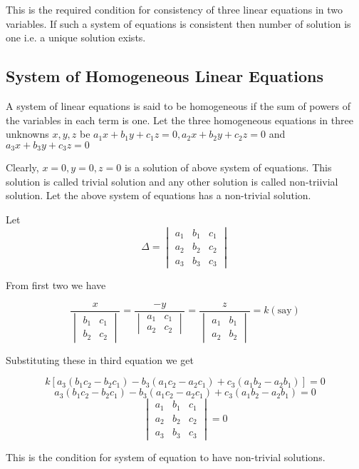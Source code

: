 This is the required condition for consistency of three linear equations in two variables. If such a system of equations is
consistent then number of solution is one i.e. a unique solution exists.

\subsection{System of Homogeneous Linear Equations}
A system of linear equations is said to be homogeneous if the sum of powers of the variables in each term is one. Let the three
homogeneous equations in three unknowns $x, y, z$ be $a_1x + b_1y + c_1z = 0, a_2x + b_2y + c_2z = 0$ and $a_3x + b_3y + c_3z = 0$

Clearly, $x = 0, y = 0, z= 0$ is a solution of above system of equations. This solution is called trivial solution and any other
solution is called non-triivial solution. Let the above system of equations has a non-trivial solution.

Let $$\Delta = \begin{vmatrix}a_1&b_1&c_1\\a_2&b_2&c_2\\a_3&b_3&c_3\end{vmatrix}$$

From first two we have

$$\frac{x}{\begin{vmatrix}b_1 & c_1\\b_2 & c_2\end{vmatrix}} =
\frac{-y}{\begin{vmatrix}a_1 & c_1\\a_2 & c_2\end{vmatrix}} =
\frac{z}{\begin{vmatrix}a_1 & b_1\\a_2 & b_2\end{vmatrix}} = k(\text{say})$$

Substituting these in third equation we get

$$k[a_3(b_1c_2 - b_2c_1) - b_3(a_1c_2 - a_2c_1) + c_3(a_1b_2 - a_2b_1)] =0$$
$$a_3(b_1c_2 - b_2c_1) - b_3(a_1c_2 - a_2c_1) + c_3(a_1b_2 - a_2b_1) = 0$$
$$\begin{vmatrix}a_1&b_1&c_1\\a_2&b_2&c_2\\a_3&b_3&c_3\end{vmatrix} = 0$$

This is the condition for system of equation to have non-trivial solutions.

